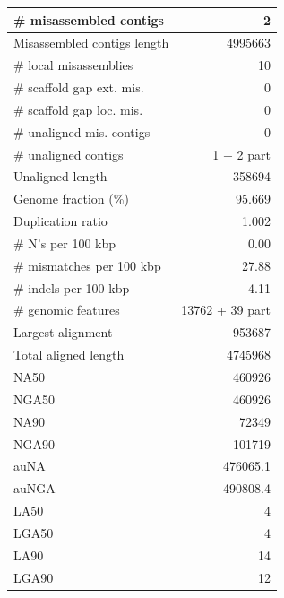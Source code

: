 \documentclass[12pt,a4paper]{article}
\begin{document}
\begin{table}[ht]
\begin{center}
\begin{tabular}{|l*{1}{|r}|}
\# misassembled contigs & 2 \\ \hline
Misassembled contigs length & 4995663 \\ \hline
\# local misassemblies & 10 \\ \hline
\# scaffold gap ext. mis. & 0 \\ \hline
\# scaffold gap loc. mis. & 0 \\ \hline
\# unaligned mis. contigs & 0 \\ \hline
\# unaligned contigs & 1 + 2 part \\ \hline
Unaligned length & 358694 \\ \hline
Genome fraction (\%) & 95.669 \\ \hline
Duplication ratio & 1.002 \\ \hline
\# N's per 100 kbp & 0.00 \\ \hline
\# mismatches per 100 kbp & 27.88 \\ \hline
\# indels per 100 kbp & 4.11 \\ \hline
\# genomic features & 13762 + 39 part \\ \hline
Largest alignment & 953687 \\ \hline
Total aligned length & 4745968 \\ \hline
NA50 & 460926 \\ \hline
NGA50 & 460926 \\ \hline
NA90 & 72349 \\ \hline
NGA90 & 101719 \\ \hline
auNA & 476065.1 \\ \hline
auNGA & 490808.4 \\ \hline
LA50 & 4 \\ \hline
LGA50 & 4 \\ \hline
LA90 & 14 \\ \hline
LGA90 & 12 \\ \hline
\end{tabular}
\end{center}
\end{table}
\end{document}
